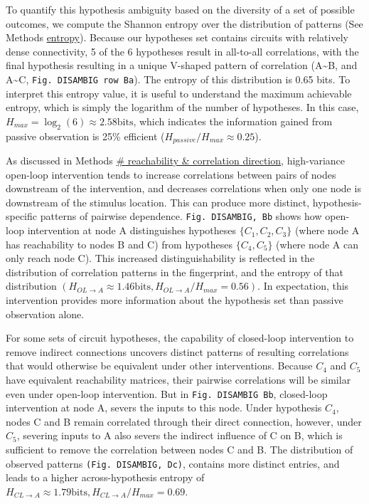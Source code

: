 \documentclass{article}
\begin{document}
To quantify this hypothesis ambiguity based on the diversity of a set of possible outcomes, we compute the Shannon entropy over the distribution of patterns (See Methods \protect\hyperlink{methods-entropy}{entropy}). Because our hypotheses set contains circuits with relatively dense connectivity, 5 of the 6 hypotheses result in all-to-all correlations, with the final hypothesis resulting in a unique V-shaped pattern of correlation (A\textasciitilde B, and A\textasciitilde C,
\texttt{Fig.\ DISAMBIG\ row\ Ba}). The entropy of this distribution is 0.65 bits. To interpret this entropy value, it is useful to understand the maximum achievable entropy, which is simply the logarithm of the number of hypotheses. In this case,
\(H_{max} = \log_2(6)\approx 2.58 \text{bits}\), which indicates the information gained from passive observation is 25\% efficient
(\(H_{passive} / H_{max} \approx 0.25\)).

As discussed in Methods
\href{/section_content/methods_coreach_sign.md}{\# reachability \&
correlation direction}, high-variance open-loop intervention tends to increase correlations between pairs of nodes downstream of the intervention, and decreases correlations when only one node is downstream of the stimulus location. This can produce more distinct, hypothesis-specific patterns of pairwise dependence.
\texttt{Fig.\ DISAMBIG,\ Bb} shows how open-loop intervention at node A distinguishes hypotheses \(\{C_1,C_2,C_3\}\) (where node A has reachability to nodes B and C) from hypotheses \(\{C_4,C_5\}\) (where node A can only reach node C). This increased distinguishability is reflected in the distribution of correlation patterns in the fingerprint, and the entropy of that distribution
\((H_{OL→A} \approx 1.46 \text{bits}, H_{OL→A}/H_{max} = 0.56)\). In expectation, this intervention provides more information about the hypothesis set than passive observation alone.

For some sets of circuit hypotheses, the capability of closed-loop intervention to remove indirect connections uncovers distinct patterns of resulting correlations that would otherwise be equivalent under other interventions. Because \(C_4\) and \(C_5\) have equivalent reachability matrices, their pairwise correlations will be similar even under open-loop intervention. But in \texttt{Fig.\ DISAMBIG\ Bb}, closed-loop intervention at node A, severs the inputs to this node. Under hypothesis
\(C_4\), nodes C and B remain correlated through their direct connection, however, under \(C_5\), severing inputs to A also severs the indirect influence of C on B, which is sufficient to remove the correlation between nodes C and B. The distribution of observed patterns
\texttt{(Fig.\ DISAMBIG,\ Dc)}, contains more distinct entries, and leads to a higher across-hypothesis entropy of
\(H_{CL→A} \approx 1.79 \text{bits}, H_{CL→A}/H_{max} = 0.69\).
\end{document}
